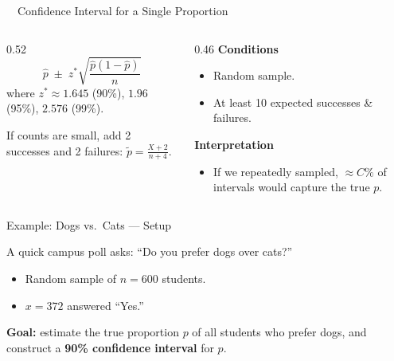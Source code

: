 \documentclass[aspectratio=169,11pt]{beamer}
\begin{document}
\begin{frame}{\ \ Confidence Interval for a Single Proportion}
  \begin{columns}[T]
    \begin{column}{0.52\textwidth}
      \begin{equation*}
        \hat{p} \;\pm\; z^{*}\sqrt{\frac{\hat{p}(1-\hat{p})}{n}}
      \end{equation*}
      {\small where $z^{*} \approx 1.645$ (90\%), $1.96$ (95\%), $2.576$ (99\%).}
      \vspace{0.5em}
      \begin{keybox}
        \small If counts are small, add 2 successes and 2 failures:
        $\displaystyle \tilde{p} = \frac{X+2}{n+4}$.
      \end{keybox}
    \end{column}
    \begin{column}{0.46\textwidth}
      \textbf{\color{qrnavy}Conditions}
      \begin{itemize}
        \item Random sample.
        \item At least 10 expected successes \& failures.
      \end{itemize}
      \vspace{0.4em}
      \textbf{\color{qrnavy}Interpretation}
      \begin{itemize}
        \item If we repeatedly sampled, $\approx C\%$ of intervals would capture the true $p$.
      \end{itemize}
    \end{column}
  \end{columns}
\end{frame}

\begin{frame}{Example: Dogs vs.\ Cats --- Setup}
  \begin{keybox}[Scenario]
    A quick campus poll asks: ``Do you prefer dogs over cats?''
    \begin{itemize}
      \item Random sample of $n = 600$ students.
      \item $x = 372$ answered ``Yes.''
    \end{itemize}
  \end{keybox}
  \vspace{0.6em}
  \begin{center}
    \textbf{Goal:} estimate the true proportion $p$ of all students who prefer dogs,
    and construct a \textbf{90\% confidence interval} for $p$.
  \end{center}
\end{frame}
\end{document}
